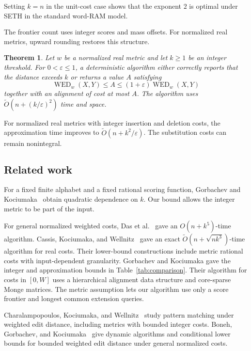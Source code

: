 \documentclass[11pt]{article}
\newtheorem{theorem}{Theorem}[section]
\theoremstyle{remark}
\newcommand{\WED}{\operatorname{WED}}
\newcommand{\eps}{\varepsilon}
\newcommand{\softO}{\widetilde O}
\begin{document}
Setting $k=n$ in the unit-cost case shows that the exponent $2$ is
optimal under SETH in the standard word-RAM model.

The frontier count uses integer scores and mass offsets. For normalized
real metrics, upward rounding restores this structure.

\begin{theorem}\label{thm:approximation}
Let $w$ be a normalized real metric and let $k\ge1$ be an integer
threshold. For $0<\eps\le1$, a deterministic algorithm either correctly
reports that the distance exceeds $k$ or returns a value $A$ satisfying
\[
 \WED_w(X,Y)\le A\le(1+\eps)\WED_w(X,Y)
\]
together with an alignment of cost at most $A$.
The algorithm uses $\softO(n+(k/\eps)^2)$ time and space.
\end{theorem}

For normalized real metrics with integer insertion and deletion costs, the
approximation time improves to $\softO(n+k^2/\eps)$.
The substitution costs can remain nonintegral.

\subsection{Related work}\label{sec:related}

For a fixed finite
alphabet and a fixed rational scoring function, Gorbachev and
Kociumaka~\cite{GK25} obtain quadratic dependence on $k$.
Our bound allows the integer metric to be part of the input.

For general normalized weighted costs, Das et al.~\cite{DGHKS23}
gave an $O(n+k^5)$-time algorithm. Cassis, Kociumaka, and
Wellnitz~\cite{CKW23} gave an exact
$\softO(n+\sqrt{nk^3})$-time algorithm for real costs. Their
lower-bound constructions include metric rational costs with
input-dependent granularity. Gorbachev and Kociumaka
gave the integer and approximation bounds in
Table~\ref{tab:comparison}.
Their algorithm for costs in $[0,W]$ uses a hierarchical alignment
data structure and core-sparse Monge matrices. The metric assumption
lets our algorithm use only a score frontier and longest common
extension queries.

Charalampopoulos, Kociumaka, and Wellnitz~\cite{CKW25} study pattern
matching under weighted edit distance, including metrics with bounded
integer costs. Boneh, Gorbachev, and Kociumaka~\cite{BGK25} give dynamic
algorithms and conditional lower bounds for bounded weighted edit
distance under general normalized costs.
\end{document}

